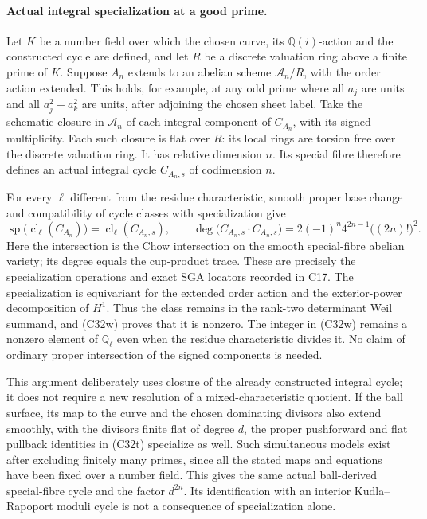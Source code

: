 \documentclass[11pt]{article}
\newcommand{\Q}{\mathbb Q}\newcommand{\C}{\mathbb C}\newcommand{\Z}{\mathbb Z}\newcommand{\R}{\mathbb R}\newcommand{\A}{\mathbb A}\newcommand{\OO}{\mathcal O}
\theoremstyle{definition}\newtheorem{definition}[theorem]{Definition}\newtheorem{remark}[theorem]{Remark}
\begin{document}
\paragraph{Actual integral specialization at a good prime.}
Let $K$ be a number field over which the chosen curve, its
$\Q(i)$-action and the constructed cycle are defined, and
let $R$ be a discrete valuation ring above a finite prime
of $K$. Suppose $A_n$ extends to an abelian scheme
$\mathcal A_n/R$, with the order action extended. This
holds, for example, at any odd prime where all $a_j$ are
units and all $a_j^2-a_k^2$ are units, after adjoining the
chosen sheet label. Take the schematic closure in
$\mathcal A_n$ of each integral component of $C_{A_n}$,
with its signed multiplicity. Each such closure is flat
over $R$: its local rings are torsion free over the
discrete valuation ring. It has relative dimension $n$.
Its special fibre therefore defines an actual integral
cycle $C_{A_n,s}$ of codimension $n$.

For every $\ell$ different from the residue characteristic,
smooth proper base change and compatibility of cycle
classes with specialization give
\[
 \operatorname{sp}\bigl(\operatorname{cl}_{\ell}(C_{A_n})\bigr)
       =\operatorname{cl}_{\ell}(C_{A_n,s}),\qquad
 \deg\bigl(C_{A_n,s}\cdot C_{A_n,s}\bigr)
       =2(-1)^n4^{2n-1}\bigl((2n)!\bigr)^2.
                                                        \tag{C32w}
\]
Here the intersection is the Chow intersection on the
smooth special-fibre abelian variety; its degree equals
the cup-product trace. These are precisely the
specialization operations and exact SGA locators recorded
in C17. The specialization is equivariant for the extended
order action and the exterior-power decomposition of
$H^1$. Thus the class remains in the rank-two determinant
Weil summand, and (C32w) proves that it is nonzero. The
integer in (C32w) remains a nonzero element of $\Q_\ell$
even when the residue characteristic divides it. No
claim of ordinary proper intersection of the signed
components is needed.

This argument deliberately uses closure of the already
constructed integral cycle; it does not require a new
resolution of a mixed-characteristic quotient. If the
ball surface, its map to the curve and the chosen
dominating divisors also extend smoothly, with the
divisors finite flat of degree $d$, the proper pushforward
and flat pullback identities in (C32t) specialize as
well. Such simultaneous models exist after excluding
finitely many primes, since all the stated maps and
equations have been fixed over a number field. This
gives the same actual ball-derived special-fibre cycle
and the factor $d^{2n}$. Its identification with an
interior Kudla--Rapoport moduli cycle is not a consequence
of specialization alone.
\end{document}

